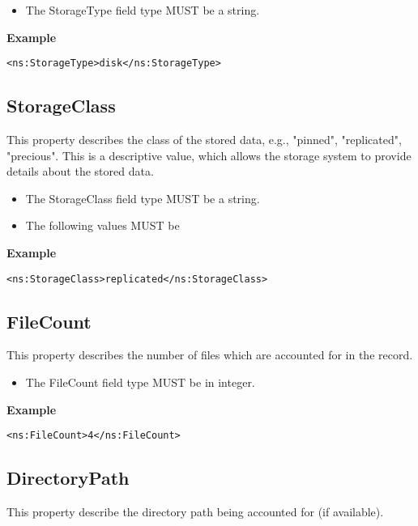 \begin{itemize}
\item The StorageType field type MUST be a string.
\end{itemize}

{\bf Example}
\begin{verbatim}
<ns:StorageType>disk</ns:StorageType>
\end{verbatim}



\subsection{StorageClass}

This property describes the class of the stored data, e.g., "pinned",
"replicated", "precious". This is a descriptive value, which allows the storage
system to provide details about the stored data.

\begin{itemize}
\item The StorageClass field type MUST be a string.
\item The following values MUST be 
\end{itemize}

{\bf Example}
\begin{verbatim}
<ns:StorageClass>replicated</ns:StorageClass>
\end{verbatim}


\subsection{FileCount}

This property describes the number of files which are accounted for in the
record.

\begin{itemize}
\item The FileCount field type MUST be in integer.
\end{itemize}

{\bf Example}
\begin{verbatim}
<ns:FileCount>4</ns:FileCount>
\end{verbatim}



\subsection{DirectoryPath}

This property describe the directory path being accounted for (if available).

